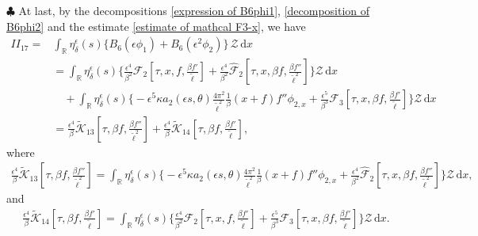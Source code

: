 \documentclass[10pt, reqno]{amsart}
\numberwithin{equation}{section}
\theoremstyle{definition}
\begin{document}
{\smallskip\noindent$\clubsuit$
At last, by the decompositions \eqref{expression of B6phi1}, \eqref{decomposition of B6phi2} and the estimate \eqref{estimate of mathcal F3-x}, we have
\begin{align} \label{B6phi1 + B6phi2-intergral Z}
II_{17}
=&\int_{\mathbb R} \eta_\delta^\epsilon(s) \Bigg\{ B_{6}(\epsilon\phi_1)
 + B_6 (\epsilon^2{\phi_2}) \Bigg\} \,{\mathcal Z} \,{\mathrm d}x
 \nonumber\\[2mm]
& = \int_{\mathbb R} \eta_\delta^\epsilon(s) \Bigg\{ \frac{\epsilon^4}{\beta^2} \mathcal F_2\left[\tau, x, f, \frac{\beta f'}{\tilde\ell}\right]+ \frac{\epsilon^4}{\beta^2} \hat{\mathcal F}_2\left[\tau, x, \beta f, \frac{\beta f''}{\tilde\ell^2} \right] \Bigg\} \mathcal Z \,{\mathrm d}x
\nonumber\\[2mm]
& \quad+ \int_{\mathbb R} \eta_\delta^\epsilon(s) \Bigg\{ -\epsilon^5 \kappa a_2(\epsilon s, \theta) \frac{ 4\pi^2} {{\tilde\ell}^2}\frac{1}{\beta} (x+f)f'' \phi_{2, x}+ \frac{\epsilon^5}{\beta^3} \mathcal F_3\left[\tau, x, \beta f, \frac{\beta f'}{\tilde\ell}\right] \Bigg\} \mathcal Z \,{\mathrm d}x
\nonumber\\[2mm]
& = \frac{\epsilon^4}{\beta}\tilde{\mathcal K}_{13}\left[\tau, \beta f, \frac{\beta f''}{\tilde\ell^2}\right] + \frac{\epsilon^4}{\beta}\tilde{\mathcal K}_{14}\left[\tau, \beta f, \frac{\beta f'}{\tilde\ell}\right],
\end{align}
 where
\begin{align*}
\frac{\epsilon^4}{\beta}\tilde{\mathcal K}_{13}\left[\tau, \beta f, \frac{\beta f''}{\tilde\ell^2}\right]
= \int_{\mathbb R} \eta_\delta^\epsilon(s) \Bigg\{ -\epsilon^5 \kappa a_2(\epsilon s, \theta) \frac{ 4\pi^2} {{\tilde\ell}^2}\frac{1}{\beta} (x+f)f'' \phi_{2, x}+ \frac{\epsilon^4}{\beta^2} \hat{\mathcal F}_2\left[\tau, x, \beta f, \frac{\beta f''}{\tilde\ell^2} \right] \Bigg\} \mathcal Z \,{\mathrm d}x,
\end{align*}
 and
\begin{align*}
\frac{\epsilon^4}{\beta}\tilde{\mathcal K}_{14}\left[\tau, \beta f, \frac{\beta f'}{\tilde\ell}\right]
= \int_{\mathbb R} \eta_\delta^\epsilon(s) \Bigg\{ \frac{\epsilon^4}{\beta^2} \mathcal F_2\left[\tau, x, f, \frac{\beta f'}{\tilde\ell}\right] + \frac{\epsilon^5}{\beta^3} \mathcal F_3\left[\tau, x, \beta f, \frac{\beta f'}{\tilde\ell}\right] \Bigg\} \mathcal Z \,{\mathrm d}x.
\end{align*}







}
\end{document}
